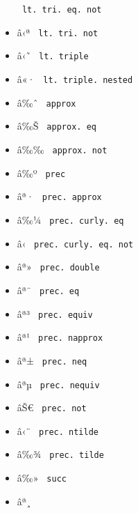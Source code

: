 \begin{itemize}
{  \texttt{\ lt.\ tri.\ eq.\ not\ }}
\item
  \label{symbol-lt.tri.not}{{ â‹ª }
  \texttt{\ lt.\ tri.\ not\ }}
\item
  \label{symbol-lt.triple}{{ â‹˜ }
  \texttt{\ lt.\ triple\ }}
\item
  \label{symbol-lt.triple.nested}{{ â«· }
  \texttt{\ lt.\ triple.\ nested\ }}
\item
  \label{symbol-approx}{{ â‰ˆ } \texttt{\ approx\ }}
\item
  \label{symbol-approx.eq}{{ â‰Š }
  \texttt{\ approx.\ eq\ }}
\item
  \label{symbol-approx.not}{{ â‰‰ }
  \texttt{\ approx.\ not\ }}
\item
  \label{symbol-prec}{{ â‰º } \texttt{\ prec\ }}
\item
  \label{symbol-prec.approx}{{ âª· }
  \texttt{\ prec.\ approx\ }}
\item
  \label{symbol-prec.curly.eq}{{ â‰¼ }
  \texttt{\ prec.\ curly.\ eq\ }}
\item
  \label{symbol-prec.curly.eq.not}{{ â‹ }
  \texttt{\ prec.\ curly.\ eq.\ not\ }}
\item
  \label{symbol-prec.double}{{ âª» }
  \texttt{\ prec.\ double\ }}
\item
  \label{symbol-prec.eq}{{ âª¯ } \texttt{\ prec.\ eq\ }}
\item
  \label{symbol-prec.equiv}{{ âª³ }
  \texttt{\ prec.\ equiv\ }}
\item
  \label{symbol-prec.napprox}{{ âª¹ }
  \texttt{\ prec.\ napprox\ }}
\item
  \label{symbol-prec.neq}{{ âª± }
  \texttt{\ prec.\ neq\ }}
\item
  \label{symbol-prec.nequiv}{{ âªµ }
  \texttt{\ prec.\ nequiv\ }}
\item
  \label{symbol-prec.not}{{ âŠ€ }
  \texttt{\ prec.\ not\ }}
\item
  \label{symbol-prec.ntilde}{{ â‹¨ }
  \texttt{\ prec.\ ntilde\ }}
\item
  \label{symbol-prec.tilde}{{ â‰¾ }
  \texttt{\ prec.\ tilde\ }}
\item
  \label{symbol-succ}{{ â‰» } \texttt{\ succ\ }}
\item
  \label{symbol-succ.approx}{{ âª¸ }
}
\end{itemize}
